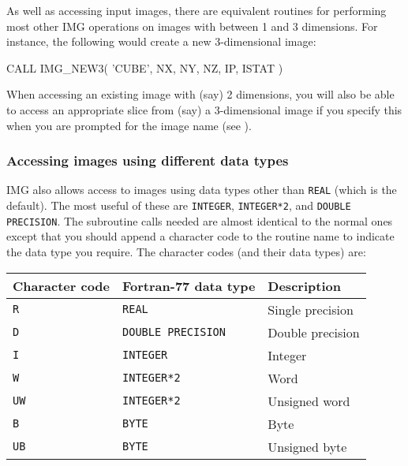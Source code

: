 \documentclass[twoside,11pt,nolof]{starlink}
\providecommand{\myverb}[1]{{\texttt{#1}}}
\newenvironment{code}{\begin{small}}
                     {\end{small}}
\begin{document}
As well as accessing input images, there are equivalent routines for
performing most other IMG operations on images with between 1 and 3
dimensions. For instance, the following would create a new
3-dimensional image:
\begin{code}
\begin{terminalv}
      CALL IMG_NEW3( 'CUBE', NX, NY, NZ, IP, ISTAT )
\end{terminalv}
\end{code}

When accessing an existing image with (say) 2 dimensions, you will
also be able to access an appropriate slice from (say) a 3-dimensional
image if you specify this when you are prompted for the image name
(see ).

\subsubsection{Accessing \label{IMGDIFFERENTDATATYPES} images using different data types}
IMG also allows access to images using data types other than
\myverb{REAL} (which is the default). The most useful of these are
\myverb{INTEGER}, \myverb{INTEGER*2}, and \myverb{DOUBLE
PRECISION}. The subroutine calls needed are almost identical to the
normal ones except that you should append a character code to the
routine name to indicate the data type you require.  The character
codes (and their data types) are:
\begin{small}
\begin{center}
\begin{tabular}{||l|l|l||}
\hline
Character code & Fortran-77 data type      &  Description      \\
\hline
 \myverb{R}    & \myverb{REAL}             &  Single precision \\
 \myverb{D}    & \myverb{DOUBLE PRECISION} &  Double precision \\
 \myverb{I}    & \myverb{INTEGER}          &  Integer          \\
\hline
  \myverb{W}   & \myverb{INTEGER*2}        &  Word             \\
  \myverb{UW}  & \myverb{INTEGER*2}        &  Unsigned word    \\
  \myverb{B}   & \myverb{BYTE}             &  Byte             \\
  \myverb{UB}  & \myverb{BYTE}             &  Unsigned byte    \\
\hline
\end{tabular}
\end{center}
\end{small}
\end{document}
